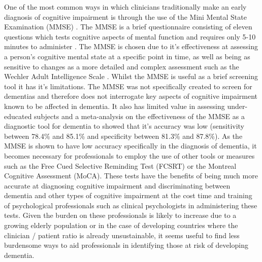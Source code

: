 \documentclass{article}
\begin{document}
One of the most common ways in which clinicians traditionally make an early diagnosis of cognitive impairment is through the use of the Mini Mental State Examination (MMSE) \cite{Folstein1975}. The MMSE is a brief questionnaire consisting of eleven questions which tests cognitive aspects of mental function and requires only 5-10 minutes to administer \cite{Folstein1975}. The MMSE is chosen due to it's effectiveness at assessing a person's cognitive mental state at a specific point in time, as well as being as sensitive to changes as a more detailed and complex assessment such as the Wechler Adult Intelligence Scale \cite{Folstein1975}. Whilst the MMSE is useful as a brief screening tool it has it's limitations. The MMSE was not specifically created to screen for dementias and therefore does not interrogate key aspects of cognitive impairment known to be affected in dementia. It also has limited value in assessing under-educated subjects and a meta-analysis on the effectiveness of the MMSE as a diagnostic tool for dementia to showed that it's accuracy was low (sensitivity between 78.4\% and 85.1\% and specificity between 81.3\% and 87.8\%). As the MMSE is shown to have low accuracy specifically in the diagnosis of dementia, it becomes necessary for professionals to employ the use of other tools or measures such as the Free Cued Selective Reminding Test (FCSRT) or the Montreal Cognitive Assessment (MoCA). These tests have the benefits of being much more accurate at diagnosing cognitive impairment and discriminating between dementia and other types of cognitive impairment at the cost time and training of psychological professionals such as clinical psychologists in administering these tests. Given the burden on these professionals is likely to increase due to a growing elderly population or in the case of developing countries where the clinician / patient ratio is already unsustainable, it seems useful to find less burdensome ways to aid professionals in identifying those at risk of developing dementia.
\par
\end{document}
